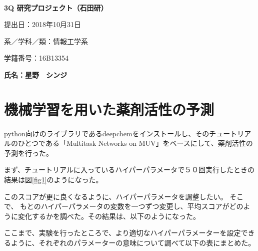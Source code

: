 \documentclass[a4j,11pt]{jarticle}
\begin{document}
\begin{center}
　\vspace{10mm}

{\bf {\huge 3Q 研究プロジェクト（石田研）}}

\vspace{80mm}

提出日：2018年10月31日

\vspace{10mm}

系／学科／類：情報工学系

\vspace{10mm}

学籍番号：16B13354

\vspace{20mm}

{\bf {\LARGE 氏名：星野　シンジ}}
\end{center}

\newpage

\section{機械学習を用いた薬剤活性の予測}

python向けのライブラリであるdeepchemをインストールし、そのチュートリアルのひとつである「Multitask Networks on MUV」をベースにして、薬剤活性の予測を行った。

まず、チュートリアルに入っているハイパーパラメータで５０回実行したときの結果は図\ref{fig1}のようになった。


このスコアが更に良くなるように、ハイパーパラメータを調整したい。
そこで、
もとのハイパーパラメータの変数を一つずつ変更し、平均スコアがどのように変化するかを調べた。その結果は、以下のようになった。


ここまで、実験を行ったところで、より適切なハイパーパラメーターを設定できるように、それぞれのパラメーターの意味について調べて以下の表にまとめた。
\end{document}

